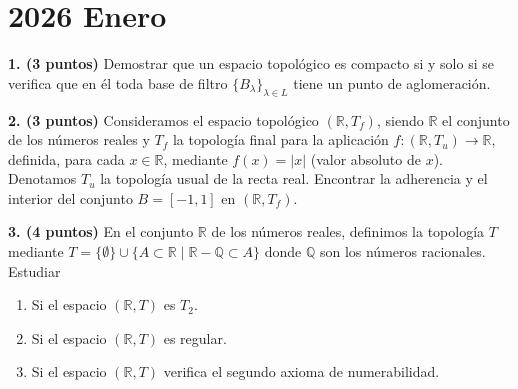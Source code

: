 \clearpage
\chapter*{2026 Enero}

\begin{enunciado}
    \hypertarget{2026 A 1}{}
    \textbf{1. (3 puntos)} Demostrar que un espacio topológico es compacto si y solo si se verifica que en él toda base de filtro \(\{B_\lambda\}_{\lambda \in L}\) tiene un punto de aglomeración.
\end{enunciado}

\begin{enunciado}
    \hypertarget{2026 A 2}{}
    \textbf{2. (3 puntos)} Consideramos el espacio topológico \((\mathbb{R}, T_f)\), siendo \(\mathbb{R}\) el conjunto de los números reales y \(T_f\) la topología final para la aplicación \(f : (\mathbb{R}, T_u) \to \mathbb{R}\), definida, para cada \(x \in \mathbb{R}\), mediante \(f(x) = |x|\) (valor absoluto de \(x\)). Denotamos \(T_u\) la topología usual de la recta real. Encontrar la adherencia y el interior del conjunto \(B = [-1, 1]\) en \((\mathbb{R}, T_f)\).
\end{enunciado}

\begin{enunciado}
    \hypertarget{2026 A 3}{}
    \textbf{3. (4 puntos)} En el conjunto \(\mathbb{R}\) de los números reales, definimos la topología \(T\) mediante \(T = \{\emptyset\} \cup \{A \subset \mathbb{R} \mid \mathbb{R} - \mathbb{Q} \subset A\}\) donde \(\mathbb{Q}\) son los números racionales. Estudiar
    \begin{enumerate}[label=\alph*)]
        \item Si el espacio \((\mathbb{R}, T)\) es \(T_2\).
        \item Si el espacio \((\mathbb{R}, T)\) es regular.
        \item Si el espacio \((\mathbb{R}, T)\) verifica el segundo axioma de numerabilidad.
    \end{enumerate}
\end{enunciado}


